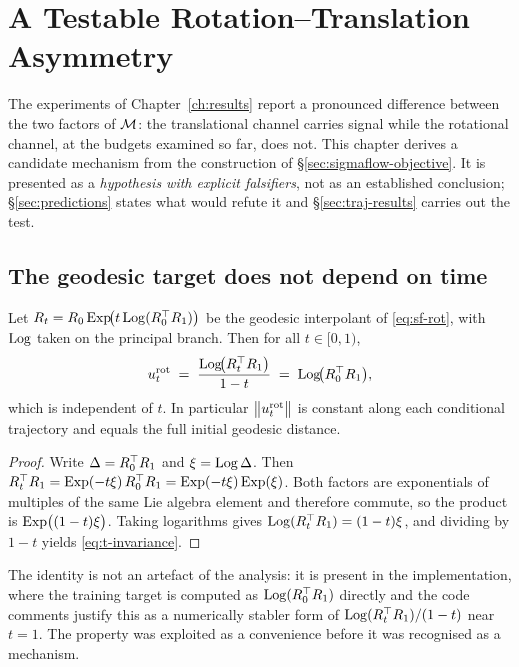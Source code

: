 \chapter{A Testable Rotation--Translation Asymmetry}
\label{ch:asymmetry}

The experiments of Chapter~\ref{ch:results} report a pronounced difference
between the two factors of $\mathcal{M}$: the translational channel carries signal
while the rotational channel, at the budgets examined so far, does not. This
chapter derives a candidate mechanism from the construction of
\S\ref{sec:sigmaflow-objective}. It is presented as a \emph{hypothesis with
explicit falsifiers}, not as an established conclusion; \S\ref{sec:predictions}
states what would refute it and \S\ref{sec:traj-results} carries out the test.

\section{The geodesic target does not depend on time}
\label{sec:t-invariance}

\begin{proposition}
\label{prop:t-invariance}
Let $R_t = R_0\operatorname{Exp}\!\bigl(t\operatorname{Log}(R_0^\top R_1)\bigr)$ be the geodesic
interpolant of \eqref{eq:sf-rot}, with $\operatorname{Log}$ taken on the principal branch.
Then for all $t \in [0,1)$,
\begin{equation}
  u_t^{\mathrm{rot}}
  \;=\; \frac{\operatorname{Log}\!\bigl(R_t^\top R_1\bigr)}{1-t}
  \;=\; \operatorname{Log}\!\bigl(R_0^\top R_1\bigr) ,
  \label{eq:t-invariance}
\end{equation}
which is independent of $t$. In particular
$\bigl\|u_t^{\mathrm{rot}}\bigr\|$ is constant along each conditional
trajectory and equals the full initial geodesic distance.
\end{proposition}

\begin{proof}
Write $\Delta = R_0^\top R_1$ and $\xi = \operatorname{Log}\Delta$. Then
$R_t^\top R_1 = \operatorname{Exp}(-t\xi)\,R_0^\top R_1 = \operatorname{Exp}(-t\xi)\operatorname{Exp}(\xi)$.
Both factors are exponentials of multiples of the same Lie algebra element and
therefore commute, so the product is $\operatorname{Exp}\bigl((1-t)\xi\bigr)$. Taking
logarithms gives $\operatorname{Log}(R_t^\top R_1) = (1-t)\xi$, and dividing by $1-t$
yields \eqref{eq:t-invariance}.
\end{proof}

The identity is not an artefact of the analysis: it is present in the
implementation, where the training target is computed as $\operatorname{Log}(R_0^\top
R_1)$ directly and the code comments justify this as a numerically stabler
form of $\operatorname{Log}(R_t^\top R_1)/(1-t)$ near $t=1$. The property was exploited
as a convenience before it was recognised as a mechanism.

